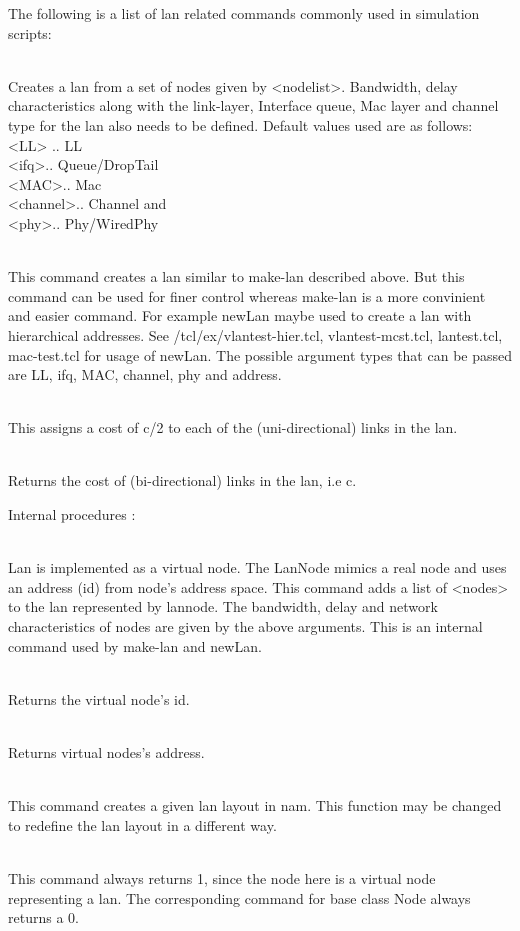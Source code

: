 The following is a list of lan related commands commonly used in
simulation scripts:
\begin{flushleft}
\\
Creates a lan from a set of nodes given by <nodelist>. Bandwidth, delay characteristics
along with the link-layer, Interface queue, Mac layer and channel type for the
lan also needs to be defined. Default values used are as follows:\\
<LL> .. LL\\
<ifq>.. Queue/DropTail\\
<MAC>.. Mac\\
<channel>.. Channel and \\
<phy>.. Phy/WiredPhy


\\
This command creates a lan similar to make-lan described above. But this
command can be used for finer control whereas make-lan is a more convinient and
easier command. For example newLan maybe used to create a lan with hierarchical
addresses. See \ns/tcl/ex/{vlantest-hier.tcl, vlantest-mcst.tcl, lantest.tcl,
mac-test.tcl} for usage of newLan. The possible argument types that can be
passed are LL, ifq, MAC, channel, phy and address.


\\
This assigns a cost of c/2 to each of the (uni-directional) links in the lan.


\\
Returns the cost of (bi-directional) links in the lan, i.e c.


Internal procedures :

\\
Lan is implemented as a virtual node. The LanNode mimics a real node and uses
an address (id) from node's address space.
This command adds a list of <nodes> to the lan represented by lannode.
The bandwidth, delay and network characteristics of nodes are given by
the above arguments. This is an internal command used by make-lan and newLan.


\\
Returns the virtual node's id.


\\
Returns virtual nodes's address.


\\
This command creates a given lan layout in nam. This function may be changed
to redefine the lan layout in a different way.


\\
This command always returns 1, since the node here is a virtual node
representing a lan. The corresponding command for base class Node 
 always returns a 0.

\end{flushleft}

%
\endinput



